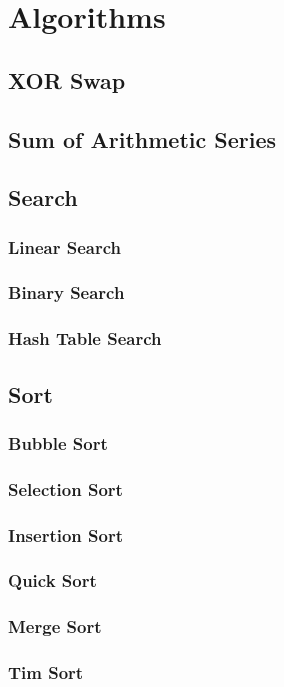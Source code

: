 \chapter{Algorithms}%
\section{XOR Swap}

\section{Sum of Arithmetic Series}

\section{Search}

\subsection{Linear Search}

\subsection{Binary Search}

\subsection{Hash Table Search}

\section{Sort}
\subsection{Bubble Sort}

\subsection{Selection Sort}

\subsection{Insertion Sort}

\subsection{Quick Sort}

\subsection{Merge Sort}

\subsection{Tim Sort}


